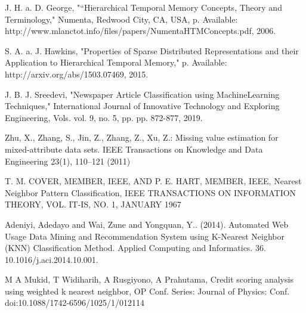 \documentclass[conference]{IEEEtran}
\begin{document}
\begin{thebibliography}{1}
J. H. a. D. George, "“Hierarchical Temporal Memory Concepts, Theory and Terminology," Numenta, Redwood City, CA, USA, p. Available: http://www.mlanctot.info/files/papers/NumentaHTMConcepts.pdf, 2006.

S. A. a. J. Hawkins, "Properties of Sparse Distributed Representations and their Application to Hierarchical Temporal Memory," p. Available: http://arxiv.org/abs/1503.07469, 2015.

J. B. J. Sreedevi, "Newspaper Article Classification using MachineLearning Techniques," International Journal of Innovative Technology and Exploring Engineering, Vols. vol. 9, no. 5, pp. pp. 872-877, 2019.

Zhu, X., Zhang, S., Jin, Z., Zhang, Z., Xu, Z.: Missing value estimation for mixed-attribute data sets. IEEE Transactions on Knowledge and Data Engineering 23(1), 110–121 (2011)

T. M. COVER, MEMBER, IEEE, AND P. E. HART, MEMBER, IEEE, Nearest Neighbor Pattern Classification, IEEE TRANSACTIONS ON INFORMATION THEORY, VOL. IT-IS, NO. 1, JANUARY 1967

Adeniyi, Adedayo and Wai, Zune and Yongquan, Y.. (2014). Automated Web Usage Data Mining and Recommendation System using K-Nearest Neighbor (KNN) Classification Method. Applied Computing and Informatics. 36. 10.1016/j.aci.2014.10.001. 

M A Mukid, T Widiharih, A Rusgiyono, A Prahutama, Credit scoring analysis using weighted k nearest neighbor, OP Conf. Series: Journal of Physics: Conf. doi:10.1088/1742-6596/1025/1/012114


\end{thebibliography}




\end{document}
